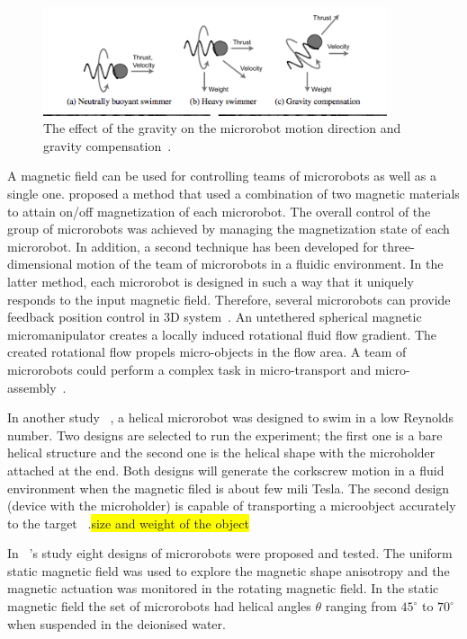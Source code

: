 \documentclass[12pt,a4paper,titlepage]{report}
\newcommand{\hilight}[1]{\colorbox{yellow}{#1}}
\begin{document}
\begin{figure}
  \centering
    \includegraphics[width=0.9\textwidth]{11}
  \caption{The effect of the gravity on the microrobot motion direction and gravity compensation~\citep{mahoney2011velocity}.}
  \label{11}
\end{figure}


A magnetic field can be used for controlling teams of microrobots as well as a single 
one. \citeauthor{kim2013fabrication} proposed a method that used a combination of two magnetic materials to 
attain on/off magnetization of each microrobot. The overall control of the group of microrobots 
was achieved by managing the magnetization state of each microrobot. In addition, a second technique has been 
developed for three-dimensional motion of the team of microrobots in a fluidic environment. In
 the latter method, each microrobot is designed in such a way that it uniquely responds to the 
input magnetic field. Therefore, several microrobots can provide feedback position control in 
3D system~\citep{kim2013fabrication}.
An untethered spherical magnetic micromanipulator creates a locally induced rotational fluid flow gradient. 
The created rotational flow propels micro-objects in the flow area. A team of microrobots could perform
 a complex task in micro-transport and micro-assembly~\citep{kim2013fabrication}.

In another study ~\citep{tottori2012magnetic}, a helical microrobot was designed to swim in a low Reynolds number. 
Two designs are selected to run the experiment;  the first one is a bare helical structure and the second one is the
 helical shape with the microholder attached at the end. Both designs will generate the corkscrew
 motion in a fluid environment when the magnetic filed is about few mili Tesla. The second 
design (device with the microholder) is capable of transporting a microobject accurately to the 
target ~\citep{tottori2012magnetic}.\hilight{size and weight of the object}


In ~\citeauthor{tottori2012magnetic}\rq{}s study eight designs of microrobots were proposed and tested. 
The uniform static magnetic field was used to explore the magnetic shape anisotropy and the 
magnetic actuation was monitored in the rotating magnetic field. In the static magnetic field the 
set of microrobots had helical angles $\theta$ ranging from ${45^{\circ}}$ to ${70^{\circ}}$ when suspended in the deionised water. 
\end{document}
